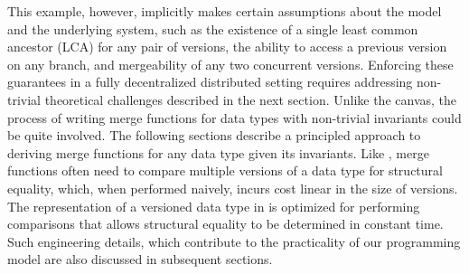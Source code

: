 This example, however, implicitly makes certain assumptions
about the model and the underlying system, such as the existence of a
single least common ancestor (LCA) for any pair of versions, the
ability to access a previous version on any branch, and mergeability
of any two concurrent versions. Enforcing these guarantees in a fully
decentralized distributed setting requires addressing non-trivial
theoretical challenges described in the next section. Unlike the
canvas, the process of writing merge functions for data types with
non-trivial invariants could be quite involved. The following sections
describe a principled approach to deriving merge functions for any
data type given its invariants. Like , merge functions
often need to compare multiple versions of a data type for structural
equality, which, when performed naively, incurs cost linear in the
size of versions. The representation of a versioned data type in \name
is optimized for performing comparisons that allows structural
equality to be determined in constant time. Such engineering details,
which contribute to the practicality of our programming model are also
discussed in subsequent sections.

